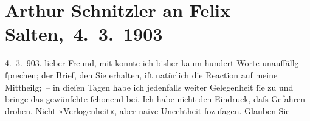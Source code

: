 

         
         \renewcommand{\erwaehntePersonen}{Personen: Otto Brahm, Paul Goldmann, Mirjam Horwitz, Heinrich Kanner, Adolf Lantz, Emil Lessing, Theodore Rottenberg, Felix Salten, Ottilie Salten, Olga Schnitzler, Julius Schnitzler, Curt Wigand}
         \renewcommand{\erwaehnteInstitutionen}{Institutionen: Die Zeit}
         \renewcommand{\erwaehnteOrte}{Orte: Berlin, Wien}
         \renewcommand{\erwaehnteWerke}{Werke: Der Schleier der Beatrice. Schauspiel in fünf Akten, Tagebuch}
               \section[ Arthur Schnitzler an Felix Salten, 4. 3. 1903]{ Arthur Schnitzler an Felix Salten, 4. 3. 1903}\nopagebreak{}\rehead{ }\begin{ledgroupsized}[t]{13cm}\normalsize\beginnumbering{} \toendnotes[C]{\smallbreak\pagebreak[2]} 
\toendnotes[C]{\smallbreak}\pstart
           \raggedleft{}{\pb}4. \textcolor{gray}{3}. 903.\pend
           \pstart
           lieber Freund, mit \label{K_L02980-1v}\label{K_L02980-1h} konnte ich bisher kaum hundert Worte unauffällg ſprechen; der Brief, den Sie
               erhalten, iſt natürlich die Reaction auf meine Mittheilg; – in dieſen Tagen habe ich
               jedenfalls weiter Gelegenheit ſie zu \label{K_L02980-2v}\label{K_L02980-2h} und bringe das gewünſchte ſchonend bei. Ich habe nicht den Eindruck, daſs
               Gefahren drohen. Nicht »Verlogenheit«, aber naive Unechtheit ſozuſagen. Glauben Sie

\end{ledgroupsized}
